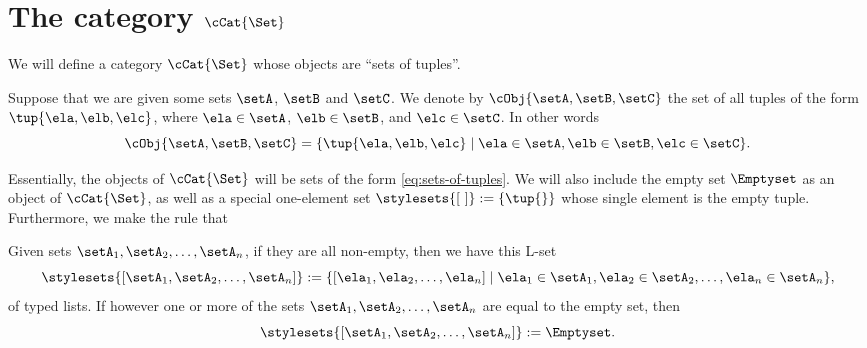 
\section{The category $\cCat{\Set}$}

We will define a category $\cCat{\Set}$ whose objects are ``sets of tuples''.


%
%
%


Suppose that we are given some sets $\setA$, $\setB$ and $\setC$.
We denote by $\cObj{\setA, \setB, \setC}$ the set of all tuples of the form $\tup{\ela, \elb, \elc}$, where $\ela \in \setA$, $\elb \in \setB$, and $\elc \in \setC$.
In other words
\begin{equation}\label{eq:sets-of-tuples}
    \cObj{\setA, \setB, \setC} = \{ \tup{\ela, \elb, \elc} \mid \ela \in \setA, \elb \in \setB, \elc \in \setC \}.
\end{equation}

Essentially, the objects of $\cCat{\Set}$ will be sets of the form \cref{eq:sets-of-tuples}. We will also include the empty set $\Emptyset$ as an object of $\cCat{\Set}$, as well as a special one-element set $\stylesets{[ \ ]} := \{ \tup{} \}$ whose single element is the empty tuple. Furthermore, we make the rule that 

Given sets $\setA_1, \setA_2, \dots , \setA_n$, if they are all non-empty, then we have this L-set
\begin{equation}
    \stylesets{[\setA_1, \setA_2, \dots, \setA_n]} := \{ [ \ela_1, \ela_2, \dots, \ela_n] \mid \ela_1 \in \setA_1, \ela_2 \in \setA_2, \dots, \ela_n \in \setA_n \},
\end{equation}
of typed lists.
If however one or more of the sets $\setA_1, \setA_2, \dots , \setA_n$ are equal to the empty set, then \begin{equation}
    \stylesets{[\setA_1, \setA_2, \dots, \setA_n]} := \Emptyset.
\end{equation}

